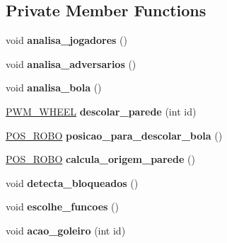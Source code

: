 \subsection*{Private Member Functions}
\begin{DoxyCompactItemize}
\item 
void {\bfseries analisa\+\_\+jogadores} ()\hypertarget{classStrategy_a22fbf049a2b0e4ff697866d223ca93cc}{}\label{classStrategy_a22fbf049a2b0e4ff697866d223ca93cc}

\item 
void {\bfseries analisa\+\_\+adversarios} ()\hypertarget{classStrategy_a0ba612a295d538a780e31da99897ae90}{}\label{classStrategy_a0ba612a295d538a780e31da99897ae90}

\item 
void {\bfseries analisa\+\_\+bola} ()\hypertarget{classStrategy_a8721df7761a7572805db3a1bbaffc4a5}{}\label{classStrategy_a8721df7761a7572805db3a1bbaffc4a5}

\item 
\hyperlink{structPWM__WHEEL}{P\+W\+M\+\_\+\+W\+H\+E\+EL} {\bfseries descolar\+\_\+parede} (int id)\hypertarget{classStrategy_a7542c99e3be12d6f2bb819b0aefad1e0}{}\label{classStrategy_a7542c99e3be12d6f2bb819b0aefad1e0}

\item 
\hyperlink{structPOS__ROBO}{P\+O\+S\+\_\+\+R\+O\+BO} {\bfseries posicao\+\_\+para\+\_\+descolar\+\_\+bola} ()\hypertarget{classStrategy_ae081c8fdde755e568b0ba599fe6d25e8}{}\label{classStrategy_ae081c8fdde755e568b0ba599fe6d25e8}

\item 
\hyperlink{structPOS__ROBO}{P\+O\+S\+\_\+\+R\+O\+BO} {\bfseries calcula\+\_\+origem\+\_\+parede} ()\hypertarget{classStrategy_a876f713232ef745cfb16fda4e1e8aec0}{}\label{classStrategy_a876f713232ef745cfb16fda4e1e8aec0}

\item 
void {\bfseries detecta\+\_\+bloqueados} ()\hypertarget{classStrategy_a9628882e44601d8ef0e18178289ba15f}{}\label{classStrategy_a9628882e44601d8ef0e18178289ba15f}

\item 
void {\bfseries escolhe\+\_\+funcoes} ()\hypertarget{classStrategy_a01f47f97f3e1cdd90408c87fd0d6cd1e}{}\label{classStrategy_a01f47f97f3e1cdd90408c87fd0d6cd1e}

\item 
void {\bfseries acao\+\_\+goleiro} (int id)\hypertarget{classStrategy_a40181903baa0465bd74a1c3c2fbb5f6c}{}\label{classStrategy_a40181903baa0465bd74a1c3c2fbb5f6c}


\end{DoxyCompactItemize}
